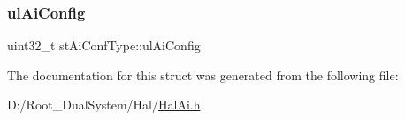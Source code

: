 \subsubsection{\texorpdfstring{ul\+Ai\+Config}{ulAiConfig}}
{\footnotesize\ttfamily uint32\+\_\+t st\+Ai\+Conf\+Type\+::ul\+Ai\+Config}



The documentation for this struct was generated from the following file\+:\begin{DoxyCompactItemize}
\item 
D\+:/\+Root\+\_\+\+Dual\+System/\+Hal/\mbox{\hyperlink{_hal_ai_8h}{Hal\+Ai.\+h}}\end{DoxyCompactItemize}

